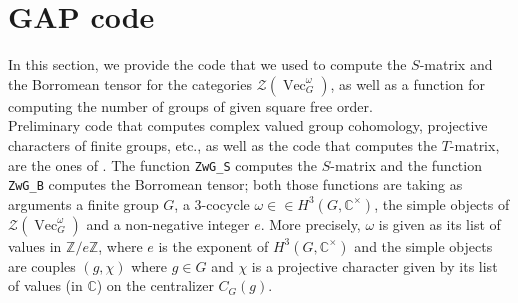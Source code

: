 \documentclass[a4paper, 10pt]{book}
\theoremstyle{definition}
\numberwithin{equation}{chapter}
\newcommand\Vect{\operatorname{Vec}}
\newcommand\CC{\mathbb C}
\newcommand\ZZ{\mathbb Z}
\newcommand\CCu{\CC^\times}
\newcommand\CTR{\mathcal Z}
\begin{document}
\section{GAP code}\label{codes}
In this section, we provide the code that we used to compute the $S$-matrix and the Borromean tensor for the categories $\CTR(\Vect_G^\omega)$, as well as a function for computing the number of groups of given square free order. \\
Preliminary code that computes complex valued group cohomology, projective characters of finite groups, etc., as well as the code that computes the $T$-matrix, are the ones of \cite{2017arXiv170806538M}. The function \lstinline!ZwG_S! computes the $S$-matrix and the function \lstinline!ZwG_B! computes the Borromean tensor; both those functions are taking as arguments a finite group $G$, a $3$-cocycle $\omega \in \in H^3(G,\CCu)$, the simple objects of $\CTR(\Vect_G^\omega)$ and a non-negative integer $e$. More precisely, $\omega$ is given as its list of values in $\ZZ/e\ZZ$, where $e$ is the exponent of $H^3(G,\CCu)$ and the simple objects are couples $(g,\chi)$ where $g \in G$ and $\chi$ is a projective character given by its list of values (in $\CC$) on the centralizer $C_G(g)$.\\
\end{document}
